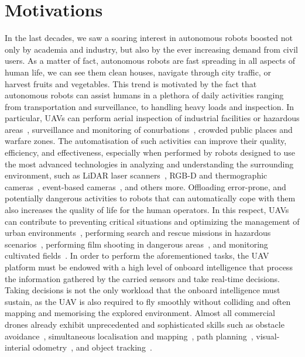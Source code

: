 \section{Motivations}%
\label{SEC:MOTIVATIONS}
In the last decades, we saw a soaring interest in autonomous robots boosted not only by academia and industry, but also
by the ever increasing demand from civil users.
As a matter of fact, autonomous robots are fast spreading in all aspects of human life, we can see them clean houses,
navigate through city traffic, or harvest fruits and vegetables.
This trend is motivated by the fact that autonomous robots can assist humans in a plethora of daily activities
ranging from transportation and surveillance, to handling heavy loads and inspection.
In particular, UAVs can perform aerial inspection of industrial facilities or hazardous areas~\cite{nikolic2013uav},
surveillance and monitoring of conurbations~\cite{faigl2018surveillance}, crowded public places and warfare zones.
The automatisation of such activities can improve their quality, efficiency, and effectiveness, especially when performed by 
robots designed to use the most advanced technologies in analyzing and understanding the surrounding environment, such as
LiDAR laser scanners~\cite{marder2010office}, RGB-D and thermographic cameras~\cite{laguela2015aerial},
event-based cameras~\cite{vidal2017hybrid}, and others more.
Offloading error-prone, and potentially dangerous activities to robots that can automatically cope with them also
increases the quality of life for the human operators. In this respect, UAVs can contribute to preventing critical
situations and optimizing the management of urban environments~\cite{viragh2016self, villa2016overview}, 
performing search and rescue missions in hazardous scenarios~\cite{azzollini2021uav}, performing film shooting
in dangerous areas~\cite{huang2018act}, and monitoring cultivated fields~\cite{tsouros2019review}.
In order to perform the aforementioned tasks, the UAV platform must be endowed with a high level of onboard
intelligence that process the information gathered by the carried sensors and take real-time decisions.
Taking decisions is not the only workload that the onboard intelligence must sustain, as the UAV is also required
to fly smoothly without colliding and often mapping and memorising the explored environment. 
Almost all commercial drones already exhibit unprecedented and sophisticated skills such as obstacle avoidance~\cite{hrabar2011reactive},
simultaneous localisation and mapping~\cite{engel2014lsd}, path planning~\cite{ok2013path},
visual-interial odometry~\cite{forster2014svo}, and object tracking~\cite{mueller2016persistent}.
